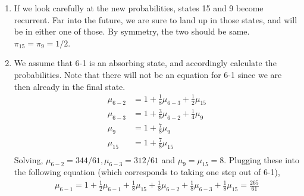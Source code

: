 \documentclass[../../probability-notes.tex]{subfiles}
\begin{document}
\begin{enumerate}
            \item If we look carefully at the new probabilities, states 15 and 9 become recurrent. Far into the future, we are sure to land up in those states, and will be in either one of those. By symmetry, the two should be same. $\pi_{15} = \pi_{9} = 1/2$.

            \item We assume that 6-1 is an absorbing state, and accordingly calculate the probabilities. Note that there will not be an equation for 6-1 since we are then already in the final state.
            \begin{align*}
                \mu_{6-2} &= 1 + \frac{1}{8} \mu_{6-3} + \frac{1}{2} \mu_{15}\\
                \mu_{6-3} &= 1 + \frac{3}{8} \mu_{6-2} + \frac{1}{4} \mu_{9}\\
                \mu_{9} &= 1 + \frac{7}{8} \mu_{9}\\
                \mu_{15} &= 1 + \frac{7}{8} \mu_{15}\\
            \end{align*}
            Solving, $\mu_{6-2} = 344/61, \mu_{6-3} = 312/61$ and $\mu_{9} = \mu_{15} = 8$. Plugging these into the following equation (which corresponds to taking one step out of 6-1),
            \begin{align*}
                \mu_{6-1} = 1 + \frac{1}{2} \mu_{6-1} + \frac{1}{8} \mu_{15} + \frac{1}{8} \mu_{6-2} + \frac{1}{8} \mu_{6-3} + \frac{1}{8} \mu_{15} = \frac{265}{61}
            \end{align*}
        \end{enumerate}
\end{document}
